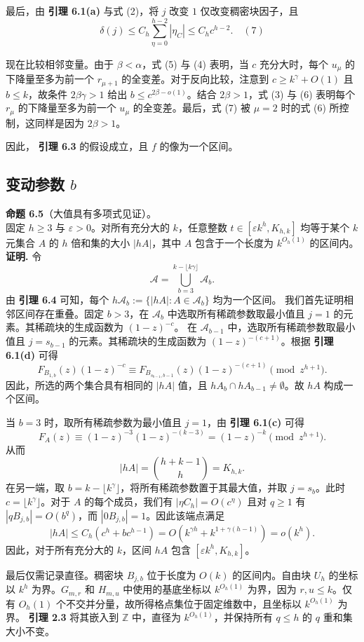 \documentclass[11pt]{article}
\theoremstyle{break}
\begin{document}
最后，由
\textbf{引理 6.1(a)}
与式 (2)，将 $j$ 改变 $1$ 仅改变稠密块因子，且
\[ \delta(j) \le C_h \sum_{\eta=0}^{h-2} |\eta_C| \le C_h c^{h-2}. \quad (7) \]

现在比较相邻变量。由于 $\beta < \alpha$，式 (5) 与 (4) 表明，当 $c$ 充分大时，每个 $u_\mu$ 的下降量至多为前一个 $r_{\mu+1}$ 的全变差。对于反向比较，注意到 $c \ge k^\gamma + O(1)$ 且 $b \le k$，故条件 $2\beta\gamma > 1$ 给出 $b \le c^{2\beta - o(1)}$。结合 $2\beta > 1$，式 (3) 与 (6) 表明每个 $r_\mu$ 的下降量至多为前一个 $u_\mu$ 的全变差。最后，式 (7) 被 $\mu=2$ 时的式 (6) 所控制，这同样是因为 $2\beta > 1$。

因此，
\textbf{引理 6.3}
的假设成立，且 $f$ 的像为一个区间。
\subsection{变动参数 $b$}
\textbf{命题 6.5}（大值具有多项式见证）。\\
固定 $h \geq 3$ 与 $\varepsilon > 0$。对所有充分大的 $k$，任意整数 $t \in [\varepsilon k^h, K_{h,k}]$ 均等于某个 $k$ 元集合 $A$ 的 $h$ 倍和集的大小 $|hA|$，其中 $A$ 包含于一个长度为 $k^{O_h(1)}$ 的区间内。
\noindent\textbf{证明.}
令
\[ \mathcal{A} = \bigcup_{b=3}^{k-\lfloor k\gamma \rfloor} \mathcal{A}_b. \]
由
\textbf{引理 6.4}
可知，每个 $h\mathcal{A}_b := \{ |hA| : A \in \mathcal{A}_b \}$ 均为一个区间。
我们首先证明相邻区间存在重叠。固定 $b > 3$，在 $\mathcal{A}_b$ 中选取所有稀疏参数取最小值且 $j = 1$ 的元素。其稀疏块的生成函数为 $(1-z)^{-c}$。
在 $\mathcal{A}_{b-1}$ 中，选取所有稀疏参数取最小值且 $j = s_{b-1}$ 的元素。其稀疏块的生成函数为 $(1-z)^{-(c+1)}$。根据
\textbf{引理 6.1(d)}
可得
\[ F_{B_{1,b}}(z)(1-z)^{-c} \equiv F_{B_{s_{b-1},b-1}}(z)(1-z)^{-(c+1)} \pmod{z^{h+1}}. \]
因此，所选的两个集合具有相同的 $|hA|$ 值，且 $hA_b \cap hA_{b-1} \neq \emptyset$。故 $hA$ 构成一个区间。

当 $b = 3$ 时，取所有稀疏参数为最小值且 $j = 1$，由
\textbf{引理 6.1(c)}
可得
\[ F_A(z) \equiv (1-z)^{-3}(1-z)^{-(k-3)} = (1-z)^{-k} \pmod{z^{h+1}}. \]
从而
\[ |hA| = \binom{h+k-1}{h} = K_{h,k}. \]
在另一端，取 $b = k - \lfloor k^\gamma \rfloor$，将所有稀疏参数置于其最大值，并取 $j = s_b$。此时 $c = \lfloor k^\gamma \rfloor$。对于 $A$ 的每个成员，我们有 $|\eta C_h| = O(c^\eta)$ 且对 $q \geq 1$ 有 $|qB_{j,b}| = O(b^q)$，而 $|0B_{j,b}| = 1$。因此该端点满足
\[ |hA| \leq C_h(c^h + b c^{h-1}) = O(k^{\gamma h} + k^{1+\gamma(h-1)}) = o(k^h). \]
因此，对于所有充分大的 $k$，区间 $hA$ 包含 $[\varepsilon k^h, K_{h,k}]$。

最后仅需记录直径。稠密块 $B_{j,b}$ 位于长度为 $O(k)$ 的区间内。自由块 $U_h$ 的坐标以 $k^h$ 为界。$G_{m,r}$ 和 $H_{m,u}$ 中使用的基底坐标以 $k^{O_h(1)}$ 为界，因为 $r,u \leq k$。仅有 $O_h(1)$ 个不交并分量，故所得格点集位于固定维数中，且坐标以 $k^{O_h(1)}$ 为界。
\textbf{引理 2.3}
将其嵌入到 $\mathbb{Z}$ 中，直径为 $k^{O_h(1)}$，并保持所有 $q \leq h$ 的 $q$ 重和集大小不变。
\end{document}
